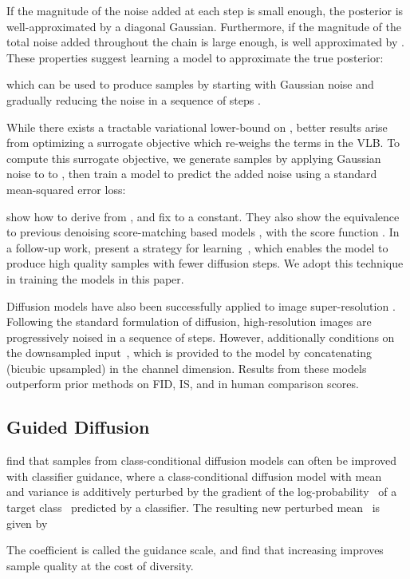 \documentclass{article}
\begin{document}
If the magnitude  of the noise added at each step is small enough, the posterior  is well-approximated by a diagonal Gaussian. Furthermore, if the magnitude  of the total noise added throughout the chain is large enough,  is well approximated by . These properties suggest learning a model  to approximate the true posterior:

which can be used to produce samples  by starting with Gaussian noise  and gradually reducing the noise in a sequence of steps .

While there exists a tractable variational lower-bound on , better results arise from optimizing a surrogate objective which re-weighs the terms in the VLB. To compute this surrogate objective, we generate samples  by applying Gaussian noise  to to , then train a model  to predict the added noise using a standard mean-squared error loss:


\citet{ddpm} show how to derive  from , and fix  to a constant. They also show the equivalence to previous denoising score-matching based models \cite{scorematching,improvedscore}, with the score function . In a follow-up work, \citet{improved} present a strategy for learning~, which enables the model to produce high quality samples with fewer diffusion steps. We adopt this technique in training the models in this paper.

Diffusion models have also been successfully applied to image super-resolution \cite{improved,sr3}. Following the standard formulation of diffusion, high-resolution images  are progressively noised in a sequence of steps. However,  additionally conditions on the downsampled input~, which is provided to the model by concatenating  (bicubic upsampled) in the channel dimension. Results from these models outperform prior methods on FID, IS, and in human comparison scores.

\subsection{Guided Diffusion}
\label{sec:guideddiffusion}

\citet{sotapaper} find that samples from class-conditional diffusion models can often be improved with classifier guidance, where a class-conditional diffusion model with mean~ and variance  is additively perturbed by the gradient of the log-probability~ of a target class~ predicted by a classifier. The resulting new perturbed mean~ is given by 

The coefficient  is called the guidance scale, and \citet{sotapaper} find that increasing  improves sample quality at the cost of diversity.
\end{document}
